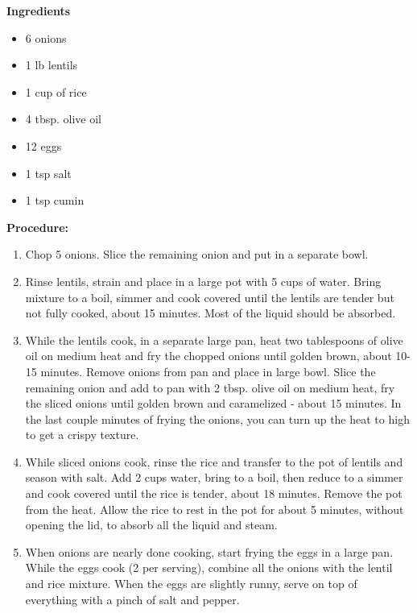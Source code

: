 \begin{multicols}{2}
\textbf{Ingredients}
\begin{itemize}


\item 6  onions
\item 1 lb lentils
\item 1 cup of rice 
\item 4 tbsp. olive oil 
\item 12 eggs 
\item 1 tsp salt 
\item 1 tsp cumin 



\end{itemize}


\columnbreak
\textbf{Procedure:}
\medskip


\begin{enumerate}
\item Chop 5 onions. Slice the remaining onion and put in a separate bowl. 
\medskip 
\item Rinse lentils, strain and place in a large pot with 5 cups of water. Bring mixture to a boil, simmer and cook covered until the lentils are tender but not fully cooked, about 15 minutes. Most of the liquid should be absorbed.
\medskip \item While the lentils cook, in a separate large pan, heat two tablespoons of olive oil on medium heat and fry the chopped onions until golden brown, about 10-15 minutes. Remove onions from pan and place in large bowl. Slice the remaining onion and add to pan with 2 tbsp. olive oil on medium heat, fry the sliced onions until golden brown and caramelized - about 15 minutes. In the last couple minutes of frying the onions, you can turn up the heat to high to get a crispy texture.


\item While sliced onions cook, rinse the rice and transfer to the pot of lentils and season with salt. Add 2 cups water, bring to a boil, then reduce to a simmer and cook covered until the rice is tender, about 18 minutes. Remove the pot from the heat. Allow the rice to rest in the pot for about 5 minutes, without opening the lid, to absorb all the liquid and steam.

\item When onions are nearly done cooking, start frying the eggs in a large pan. While the eggs cook (2 per serving), combine all the onions with the lentil and rice mixture. When the eggs are slightly runny, serve on top of everything with a pinch of salt and pepper. 

 




 
\end{enumerate}
\end{multicols}